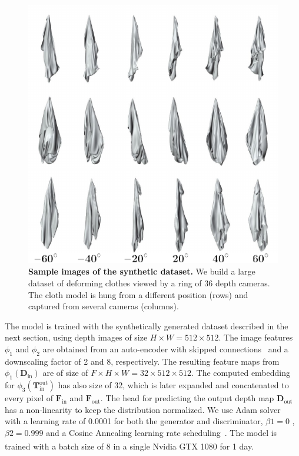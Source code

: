 \begin{figure}
    \centering
    \includegraphics[width=\linewidth]{main/chapter04/data/ipalm_cvpr_grid_dataset_synth.pdf}
    \caption[Sample images of the synthetic dataset]{{\bf Sample images of the synthetic dataset.} We build a large dataset of deforming clothes viewed by a ring of 36 depth cameras. The cloth model is hung from a different position (rows) and captured from several cameras (columns).}
    \label{fig_setup_cameras}
\end{figure}

The model is trained with the synthetically generated dataset described in the next section, using depth images of size $H \times W = 512 \times 512$. The image features $\phi_1$ and $\phi_2$ are obtained from an auto-encoder with skipped connections~\cite{pix2pix2017} and a downscaling factor of 2 and 8, respectively. The resulting feature maps from $\phi_1(\mathbf{D}_{\textrm{in}})$ are of size of $F\times H \times W = 32 \times 512 \times 512$.%
The computed embedding for $\phi_3(\mathbf{T}_{\textrm{in}}^{\textrm{out}})$ has also size of 32, which is later expanded and concatenated to every pixel of $\mathbf{F}_{\textrm{in}}$ and $\mathbf{F}_{\textrm{out}}$. The head for predicting the output depth map $\mathbf{D}_{\textrm{out}}$ has a non-linearity  to keep the distribution normalized. We use Adam solver~\cite{kingma2017adam} with a learning rate of 0.0001 for both the generator and discriminator, $\beta1 = 0$ , $\beta2 = 0.999$ and a Cosine Annealing learning rate scheduling~\cite{LoshchilovH16a}.  The model is trained with a batch size of 8 in a single Nvidia\textsuperscript{\textregistered} GTX 1080 for 1 day.

